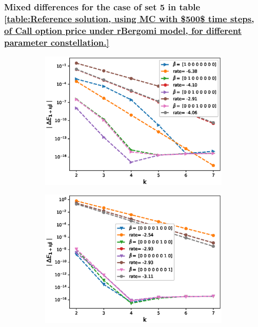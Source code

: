 \documentclass[11pt]{article}
\begin{document}
\subsubsection{Mixed differences for the case of set 5 in table \ref{table:Reference solution, using MC with $500$ time steps, of Call option price under rBergomi model, for different parameter constellation.}}\label{Mixed differences for the case of set 5}
\begin{figure}[h!]
	\centering
	\begin{subfigure}{.4\textwidth}
		\centering
		\includegraphics[width=1\linewidth]{./figures/rBergomi_mixed_error_rates/without_change_measure/N_4/H_002/first_difference_rbergomi_4steps_H_002_K_1_totally_hierarch_with_rate_W1}
		\caption{}
		\label{fig:sub3}
	\end{subfigure}%
	\begin{subfigure}{.4\textwidth}
		\centering
		\includegraphics[width=1\linewidth]{./figures/rBergomi_mixed_error_rates/without_change_measure/N_4/H_002/first_difference_rbergomi_4steps_H_002_K_1_totally_hierarch_with_rate_W2}
		\caption{}
		\label{fig:sub4}
	\end{subfigure}
	

\end{figure}
\end{document}

